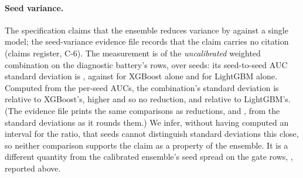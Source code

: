 \begin{table}[htbp]
\centering
\caption{Baselines on the same test rows (draw \texttt{d8083dbc}, \nTestRows{} rows holding
\nTestFraud{} fraud): AUC and recall at \nFPRBudget{} FPR at the gate's training volume
(\texttt{docs/benchmarks/m4\_gate\_d8083dbc\_v3.txt}), the AUC minus the ensemble's with a paired
account-clustered \nIntervalLevel{} interval (\texttt{evidence/round2\_gate\_d8083dbc.txt}), and the AUC of the
same baseline at full volume (\texttt{docs/benchmarks/full\_volume\_gate\_d8083dbc.txt}).}
\label{tab:baselines}
\end{table}

\paragraph{Seed variance.} The specification claims that the ensemble reduces variance by
\nSpecVarianceClaim{} against a single model; the seed-variance evidence file records that the
claim carries no citation (claims register, C-6).
The measurement is of the \emph{uncalibrated} weighted combination on the diagnostic battery's rows,
over \nSeeds{} seeds: its seed-to-seed AUC standard deviation is \nSeedSdEnsemble{}, against
\nSeedSdXGB{} for XGBoost alone and \nSeedSdLGB{} for LightGBM alone. Computed from the per-seed
AUCs, the combination's standard deviation is \nSeedSdRelXGB{} relative to XGBoost's, higher and so
no reduction, and \nSeedSdRelLGB{} relative to LightGBM's. (The evidence file prints the same
comparisons as reductions, \nSeedSdDiffXGB{} and \nSeedSdDiffLGB{}, from the standard deviations
as it rounds them.) We infer, without
having computed an interval for the ratio, that \nSeeds{} seeds cannot distinguish standard
deviations this close, so neither comparison supports the claim as a property of the ensemble. It is a different quantity from the calibrated ensemble's seed spread on the gate rows,
\nGateSeedAUC{}, reported above.

